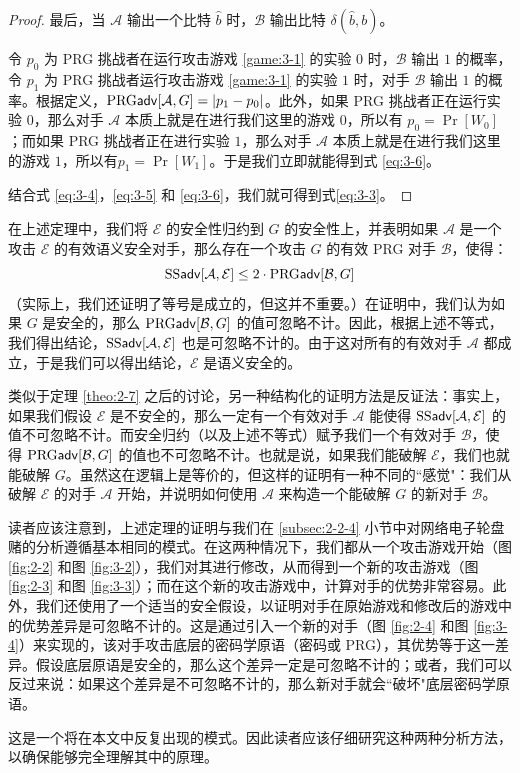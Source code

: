 \begin{proof}
\noindent
最后，当 $\mathcal A$ 输出一个比特 $\hat b$ 时，$\mathcal B$ 输出比特 $\delta(\hat b,b)$。

令 $p_0$ 为 PRG 挑战者在运行攻击游戏 \ref{game:3-1} 的实验 $0$ 时，$\mathcal B$ 输出 $1$ 的概率，令 $p_1$ 为 PRG 挑战者运行攻击游戏 \ref{game:3-1} 的实验 $1$ 时，对手 $\mathcal B$ 输出 $1$ 的概率。根据定义，${\rm PRG\mathsf{adv}}[\mathcal{A},G]=|p_1-p_0|$。此外，如果 PRG 挑战者正在运行实验 $0$，那么对手 $\mathcal A$ 本质上就是在进行我们这里的游戏 $0$，所以有 $p_0=\Pr[W_0]$；而如果 PRG 挑战者正在进行实验  $1$，那么对手 $\mathcal A$ 本质上就是在进行我们这里的游戏 $1$，所以有$p_1=\Pr[W_1]$。于是我们立即就能得到式 \ref{eq:3-6}。

结合式 \ref{eq:3-4}，\ref{eq:3-5} 和 \ref{eq:3-6}，我们就可得到式\ref{eq:3-3}。
\end{proof}

在上述定理中，我们将 $\mathcal E$ 的安全性归约到 $G$ 的安全性上，并表明如果 $\mathcal A$ 是一个攻击 $\mathcal E$ 的有效语义安全对手，那么存在一个攻击 $G$ 的有效 PRG 对手 $\mathcal B$，使得：
$$
{\rm SS\mathsf{adv}}[\mathcal{A},\mathcal{E}]\leq 2\cdot{\rm PRG\mathsf{adv}}[\mathcal{B},G]
$$
（实际上，我们还证明了等号是成立的，但这并不重要。）在证明中，我们认为如果 $G$ 是安全的，那么 ${\rm PRG\mathsf{adv}}[\mathcal{B},G]$ 的值可忽略不计。因此，根据上述不等式，我们得出结论，${\rm SS\mathsf{adv}}[\mathcal{A},\mathcal{E}]$ 也是可忽略不计的。由于这对所有的有效对手 $\mathcal A$ 都成立，于是我们可以得出结论，$\mathcal E$ 是语义安全的。

类似于定理 \ref{theo:2-7} 之后的讨论，另一种结构化的证明方法是反证法：事实上，如果我们假设 $\mathcal E$ 是不安全的，那么一定有一个有效对手 $\mathcal A$ 能使得 ${\rm SS\mathsf{adv}}[\mathcal{A},\mathcal{E}]$ 的值不可忽略不计。而安全归约（以及上述不等式）赋予我们一个有效对手 $\mathcal B$，使得 ${\rm PRG\mathsf{adv}}[\mathcal{B},G]$ 的值也不可忽略不计。也就是说，如果我们能破解 $\mathcal E$，我们也就能破解 $G$。虽然这在逻辑上是等价的，但这样的证明有一种不同的``感觉"：我们从破解 $\mathcal E$ 的对手 $\mathcal A$ 开始，并说明如何使用 $\mathcal A$ 来构造一个能破解 $G$ 的新对手 $\mathcal B$。

读者应该注意到，上述定理的证明与我们在 \ref{subsec:2-2-4} 小节中对网络电子轮盘赌的分析遵循基本相同的模式。在这两种情况下，我们都从一个攻击游戏开始（图 \ref{fig:2-2} 和图 \ref{fig:3-2}），我们对其进行修改，从而得到一个新的攻击游戏（图 \ref{fig:2-3} 和图 \ref{fig:3-3}）；而在这个新的攻击游戏中，计算对手的优势非常容易。此外，我们还使用了一个适当的安全假设，以证明对手在原始游戏和修改后的游戏中的优势差异是可忽略不计的。这是通过引入一个新的对手（图 \ref{fig:2-4} 和图 \ref{fig:3-4}）来实现的，该对手攻击底层的密码学原语（密码或 PRG），其优势等于这一差异。假设底层原语是安全的，那么这个差异一定是可忽略不计的；或者，我们可以反过来说：如果这个差异是不可忽略不计的，那么新对手就会``破坏"底层密码学原语。

这是一个将在本文中反复出现的模式。因此读者应该仔细研究这种两种分析方法，以确保能够完全理解其中的原理。